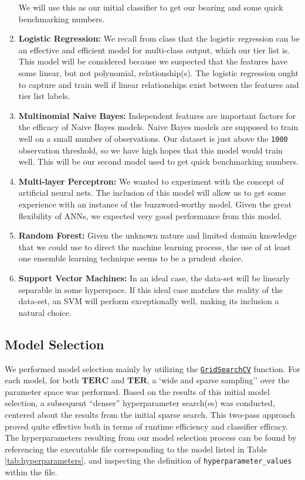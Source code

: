 \documentclass{article}
\newcommand{\TER}{\ensuremath{\mathbf{TER}}\xspace}
\newcommand{\TERC}{\ensuremath{\mathbf{TERC}}\xspace}
\begin{document}
\begin{enumerate}
	We will use this as our initial classifier to get our bearing and some quick benchmarking numbers.
	\item\textbf{Logistic Regression:}
	We recall from class that the logistic regression
	can be an effective and efficient model for multi-class output, which
	our tier list is.
	This model will be considered because we suspected that the features have some linear, but not polynomial, relationship(s).
	The	logistic regression ought to capture and train well if linear relationships exist between the features and tier list labels.
	\item\textbf{Multinomial Naive Bayes:}
	Independent features are important factors for the efficacy of Naive Bayes models.
	Naive Bayes models are supposed to train well on a small number of observations.
	Our dataset is just above the \texttt{1000} observation threshold, so we have high hopes that this model would train well.
	This will be our second model used to get quick benchmarking numbers.
	\item\textbf{Multi-layer Perceptron:}
	We wanted to experiment with the concept of artificial neural nets.
	The inclusion of this model will allow us to get some experience with an instance of the buzzword-worthy model.
	Given the great flexibility of ANNs, we expected very good performance from this model.
	\item\textbf{Random Forest:} 
	Given the unknown nature and limited domain knowledge that we could use to direct the machine learning process, the use of at least one ensemble learning technique seems to be a prudent choice.
	\item\textbf{Support Vector Machines:} 
	In an ideal case, the data-set will be linearly separable in some hyperspace.
	If this ideal case matches the reality of the data-set, an SVM will perform exceptionally well, making its inclusion a natural choice.
	
\end{enumerate}


\hypertarget{model-selection}{%
\subsection{Model Selection}\label{model-selection}}

We performed model selection mainly by utilizing the \href{https://scikit-learn.org/stable/modules/generated/sklearn.model_selection.GridSearchCV.html}{\texttt{GridSearchCV}} function.
For each model, for both \TERC and \TER, a `wide and sparse sampling'' over the parameter space was performed.
Based on the results of this initial model selection, a subsequent ``denser'' hyperparameter search(es) was conducted, centered about the results from the initial sparse search.
This two-pass approach proved quite effective both in terms of runtime efficiency and classifier efficacy.
The hyperparameters resulting from our model selection process can be found by referencing the executable file corresponding to the model listed in Table \ref{tab:hyperparameters}, and inspecting the definition of \texttt{hyperparameter\_values} within the file.
\end{document}
